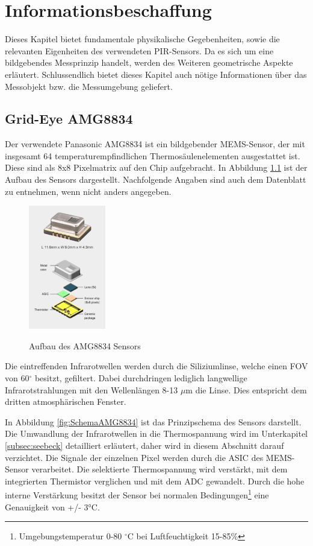 \chapter{Informationsbeschaffung}
\label{chap:Informationsbeschaffung}
Dieses Kapitel bietet fundamentale physikalische Gegebenheiten, sowie die relevanten Eigenheiten des verwendeten \ac{PIR}-Sensors. Da es sich um eine bildgebendes Messprinzip handelt, werden des Weiteren geometrische Aspekte erläutert. Schlussendlich bietet dieses Kapitel auch nötige Informationen über das Messobjekt bzw. die Messumgebung geliefert.

\section{Grid-Eye AMG8834}
\label{sec:AMG8834}

Der verwendete Panasonic AMG8834 ist ein bildgebender \ac{MEMS}-Sensor, der mit insgesamt 64 temperaturempfindlichen Thermosäulenelementen ausgestattet ist. Diese sind als 8x8 Pixelmatrix auf den Chip aufgebracht. In Abbildung \ref{fig:Explosionsdarstellung} ist der Aufbau des Sensors dargestellt. Nachfolgende Angaben sind auch dem Datenblatt zu entnehmen, wenn nicht anders angegeben.
 
\begin{figure}[H]
	\centering
	\includegraphics[width=0.3\textwidth]
	{fig/grid_eye_aufbau.PNG}
	\caption[Aufbau des AMG8834 Sensors]{Aufbau des AMG8834 Sensors} \protect\cite{AMG8834}
	\label{fig:Explosionsdarstellung}
\end{figure}
Die eintreffenden Infrarotwellen werden durch die Siliziumlinse, welche einen \ac{FOV} von 60$^\circ$ besitzt, gefiltert. Dabei durchdringen lediglich langwellige Infrarotstrahlungen mit den Wellenlängen 8-13 $\mu$m die Linse. Dies entspricht dem dritten atmosphärischen Fenster.

In Abbildung \ref{fig:SchemaAMG8834} ist das Prinzipschema des Sensors darstellt. Die Umwandlung der Infrarotwellen in die Thermospannung wird im Unterkapitel \ref{subsec:seebeck} detailliert erläutert, daher wird in diesem Abschnitt darauf verzichtet. Die Signale der einzelnen Pixel werden durch die \ac{ASIC} des \ac{MEMS}-Sensor verarbeitet. Die selektierte Thermospannung wird verstärkt, mit dem integrierten Thermistor verglichen und mit dem \ac{ADC} gewandelt. Durch die hohe interne Verstärkung besitzt der Sensor bei normalen Bedingungen\footnote[1]{Umgebungstemperatur 0-80 $^\circ$C bei Luftfeuchtigkeit 15-85\%} eine Genauigkeit von +/- 3°C. 

